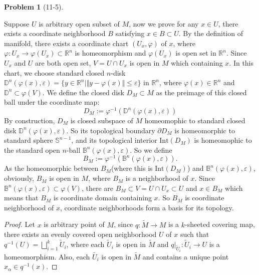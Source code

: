 \documentclass[11pt, a4paper]{article}
\theoremstyle{definition}
\newtheorem{prob}{Problem}
\newenvironment{problem}[1][]{\begin{prob}[#1]\normalfont}{\end{prob}\vspace{1.5em}}
\begin{document}
\begin{problem}[11-5]
\begin{lemma}
    Suppose $U$ is arbitrary open subset of $M$, now we prove for any $x \in U$, there exists a coordinate neighborhood 
    $B$ satisfying $x \in B \subset U$.
    By the definition of manifold, there exists a coordinate chart $(U_x,\varphi )$ of $x$, where 
    $\varphi : U_x \rightarrow \varphi(U_x)\subset \mathbb{R}^n$ is homeomorphism and $\varphi(U_x)$ is open set in 
    $\mathbb{R}^n$. Since $U_x$ and $U$ are both open set, $V = U \cap U_x$ is open in $M$ which containing $x$. In 
    this chart, we choose standard closed $n$-disk 
    $\mathbb{D}^n(\varphi(x), \varepsilon) = \{y \in \mathbb{R}^n| \Vert y - \varphi(x) \Vert \leq \varepsilon\}$ in $\mathbb{R}^n$, 
    where $ \varphi(x) \in \mathbb{R}^n$ and $\mathbb{D}^n \subset \varphi(V)$. We define the closed disk $D_M \subset M$ 
    as the preimage of this closed ball under the coordinate map:
    $$D_M := \varphi^{-1}(\mathbb{D}^n(\varphi(x), \varepsilon))$$
    By construction, $D_M$ is closed subspace of $M$ homeomophic to standard closed disk $\mathbb{D}^n(\varphi(x), \varepsilon)$. 
    So its topological boundary $\partial D_M$ is homeomorphic to standard sphere $\mathbb{S}^{n-1}$, and its topological 
    interior $\text{Int}(D_M)$ is homeomophic to the standard open $n$-ball $\mathbb{B}^n(\varphi(x), \varepsilon)$. So we define 
    $$ B_M := \varphi^{-1}(\mathbb{B}^n(\varphi(x), \varepsilon)).$$
    As the homeomorphic between $B_M$(where this is $\text{Int}(D_M)$) and $\mathbb{B}^n(\varphi(x), \varepsilon)$, 
    obviously, $B_M$ is open in $M$, where $B_M$ is a neighborhood of $x$. Since 
    $\mathbb{B}^n(\varphi(x), \varepsilon) \subset \varphi(V)$, there are $B_M \subset V = U \cap U_x \subset U$ and 
    $x \in B_M$ which means that $B_M$ is coordinate domain containing $x$. So $B_M$ is coordinate neighborhood of $x$, 
    coordinate neighborhoods form a basis for its topology.
    \end{lemma}

    \begin{proof}
    Let $x$ is arbitrary point of $M$, since $q: \widetilde{M} \to M$ is a $k$-sheeted covering map, there exists an 
    evenly covered open neighborhood $U$ of $x$ such that $q^{-1}(U) = \bigsqcup_{i=1}^k \widetilde{U}_i$, where each 
    $\widetilde{U}_i$ is open in $\widetilde{M}$ and $q|_{\widetilde{U}_i}: \widetilde{U}_i \to U$ is a homeomorphism.
    Also, each $\widetilde{U_i}$ is open in $\widetilde{M}$ and contains a unique point $x_\alpha \in q^{-1}(x)$. 
    

\end{proof}
\end{problem}
\end{document}
